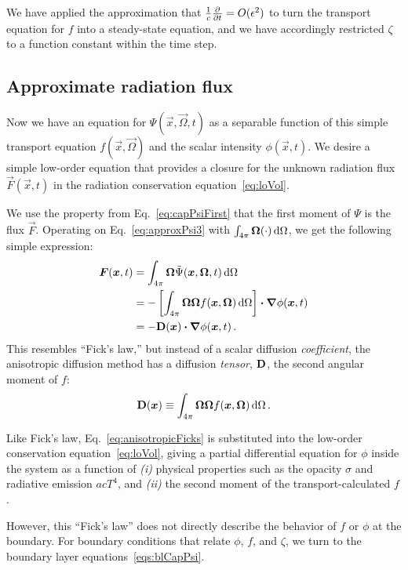We have applied the approximation that $\frac{1}{c}\frac{\partial }{\partial t}= O(\epsilon^2)$
to turn the transport equation for $f$ into a steady-state equation, and we have
accordingly restricted $\zeta$ to a function constant within the time step.

\subsection{Approximate radiation flux}
Now we have an equation for $\Psi(\vec{x}, \vec{\Omega}, t)$ as a
separable
function of this simple transport equation $f(\vec{x}, \vec{\Omega})$ and the
scalar intensity $\phi(\vec{x},t)$.
We desire a simple low-order equation that provides a closure for the unknown
radiation flux $\vec{F}(\vec{x},t)$ in the radiation conservation
equation~\eqref{eq:loVol}.

We use the property from Eq.~\eqref{eq:capPsiFirst}
that the first moment of $\Psi$ is the flux $\vec{F}$. Operating on 
Eq.~\eqref{eq:approxPsi3} with $\int_{4\pi} \bm{\Omega} (\cdot) \mathop{}\!\mathrm{d}\Omega$, we get
the following simple expression:
\begin{align} \nonumber
  \bm{F}(\bm{x}, t)
  &= \int_{4\pi} \bm{\Omega} \tilde \Psi(\bm{x}, \bm{\Omega}, t) \mathop{}\!\mathrm{d}\Omega
  \\ \nonumber
  &= 
  - \left[ \int_{4\pi} \bm{\Omega} \bm{\Omega} f(\bm{x}, \bm{\Omega})
  \mathop{}\!\mathrm{d}\Omega \right]
  \bm{\cdot} \bm{\nabla} \phi(\bm{x},t)
  \\ \label{eq:anisotropicFicks}
  &= - \mathbf{D}(\bm{x}) \bm{\cdot} \bm{\nabla} \phi(\bm{x},t) \,.
\end{align}
This resembles ``Fick's law,'' but instead of a scalar diffusion
\emph{coefficient},
the anisotropic diffusion method has a diffusion \emph{tensor}, $\mathbf{D}$, the
second angular moment of $f$:
\begin{equation}\label{eq:dDefinition}
  \mathbf{D}(\bm{x}) \equiv \int_{4\pi} \bm{\Omega} \bm{\Omega}
  f(\bm{x}, \bm{\Omega}) \mathop{}\!\mathrm{d}\Omega \,.
\end{equation}

Like Fick's law, Eq.~\eqref{eq:anisotropicFicks} is substituted into
the low-order conservation equation~\eqref{eq:loVol}, giving a partial
differential equation for $\phi$ inside the system as a function of \textsl{(i)}
physical properties such as the opacity $\sigma$ and radiative emission $a c
T^4$, and \textsl{(ii)} the second moment of the transport-calculated $f$.

However, this ``Fick's law'' does not directly describe the behavior of $f$ or
$\phi$ at the boundary. For boundary conditions that relate $\phi$, $f$, and
$\zeta$, we turn to the boundary layer equations~\eqref{eqs:blCapPsi}.

